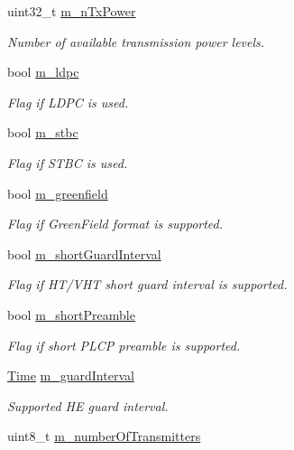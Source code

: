 \begin{DoxyCompactItemize}
uint32\+\_\+t \hyperlink{classns3_1_1WifiPhy_a8b60afe8722e7057024166152a813487}{m\+\_\+n\+Tx\+Power}
\begin{DoxyCompactList}\small\item\em Number of available transmission power levels. \end{DoxyCompactList}\item 
bool \hyperlink{classns3_1_1WifiPhy_a2315db653cc8dbd081cdb0577ad96d19}{m\+\_\+ldpc}
\begin{DoxyCompactList}\small\item\em Flag if L\+D\+PC is used. \end{DoxyCompactList}\item 
bool \hyperlink{classns3_1_1WifiPhy_ab5fa06e3d0a92ad372eb155c532f56cc}{m\+\_\+stbc}
\begin{DoxyCompactList}\small\item\em Flag if S\+T\+BC is used. \end{DoxyCompactList}\item 
bool \hyperlink{classns3_1_1WifiPhy_aed75cb200d7ff8b06c8eb651baef0d47}{m\+\_\+greenfield}
\begin{DoxyCompactList}\small\item\em Flag if Green\+Field format is supported. \end{DoxyCompactList}\item 
bool \hyperlink{classns3_1_1WifiPhy_a84526e58ca3e8abf87c9223448226416}{m\+\_\+short\+Guard\+Interval}
\begin{DoxyCompactList}\small\item\em Flag if H\+T/\+V\+HT short guard interval is supported. \end{DoxyCompactList}\item 
bool \hyperlink{classns3_1_1WifiPhy_ad2df70b891c138ec13289ec813696732}{m\+\_\+short\+Preamble}
\begin{DoxyCompactList}\small\item\em Flag if short P\+L\+CP preamble is supported. \end{DoxyCompactList}\item 
\hyperlink{classns3_1_1Time}{Time} \hyperlink{classns3_1_1WifiPhy_a2dc4ed4d032b37a87ac04628c0b3dd1e}{m\+\_\+guard\+Interval}
\begin{DoxyCompactList}\small\item\em Supported HE guard interval. \end{DoxyCompactList}\item 
uint8\+\_\+t \hyperlink{classns3_1_1WifiPhy_a332193b00d6a840263ba8e1c7661bb31}{m\+\_\+number\+Of\+Transmitters}

\end{DoxyCompactItemize}
